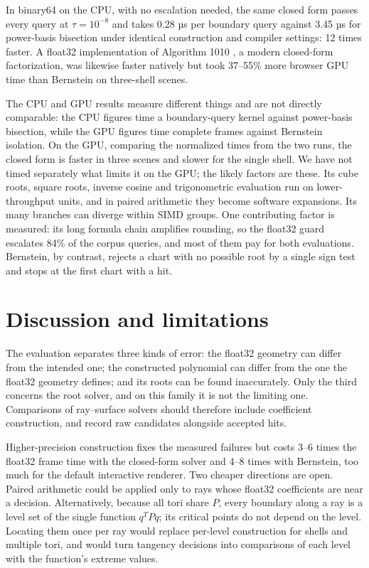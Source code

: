\documentclass{jcgt}
\begin{document}
In binary64 on the CPU, with no escalation needed, the same closed form
passes every query at \(\tau=10^{-8}\) and takes 0.28 µs per boundary
query against 3.45 µs for power-basis bisection under identical
construction and compiler settings: 12 times faster. A float32
implementation of Algorithm 1010 \citep{orellana2020, demichele2024}, a
modern closed-form factorization, was likewise faster natively but took
37--55\% more browser GPU time than Bernstein on three-shell scenes.

The CPU and GPU results measure different things and are not directly
comparable: the CPU figures time a boundary-query kernel against
power-basis bisection, while the GPU figures time complete frames
against Bernstein isolation. On the GPU, comparing the normalized times
from the two runs, the closed form is faster in three scenes and slower
for the single shell. We have not timed separately what limits it on the
GPU; the likely factors are these. Its cube roots, square roots, inverse
cosine and trigonometric evaluation run on lower-throughput units, and
in paired arithmetic they become software expansions. Its many branches
can diverge within SIMD groups. One contributing factor is measured: its
long formula chain amplifies rounding, so the float32 guard escalates
84\% of the corpus queries, and most of them pay for both evaluations.
Bernstein, by contrast, rejects a chart with no possible root by a
single sign test and stops at the first chart with a hit.

\section{Discussion and limitations}\label{discussion-and-limitations}

The evaluation separates three kinds of error: the float32 geometry can
differ from the intended one; the constructed polynomial can differ from
the one the float32 geometry defines; and its roots can be found
inaccurately. Only the third concerns the root solver, and on this
family it is not the limiting one. Comparisons of ray--surface solvers
should therefore include coefficient construction, and record raw
candidates alongside accepted hits.

Higher-precision construction fixes the measured failures but costs 3--6
times the float32 frame time with the closed-form solver and 4--8 times
with Bernstein, too much for the default interactive renderer. Two
cheaper directions are open. Paired arithmetic could be applied only to
rays whose float32 coefficients are near a decision. Alternatively,
because all tori share \(P\), every boundary along a ray is a level set
of the single function \(q^TPq\); its critical points do not depend on
the level. Locating them once per ray would replace per-level
construction for shells and multiple tori, and would turn tangency
decisions into comparisons of each level with the function's extreme
values.
\end{document}
